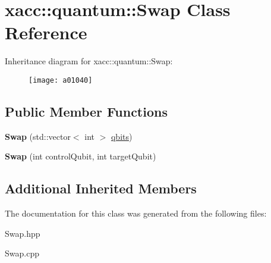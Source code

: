 \hypertarget{a01040}{}\section{xacc\+:\+:quantum\+:\+:Swap Class Reference}
\label{a01040}
Inheritance diagram for xacc\+:\+:quantum\+:\+:Swap\+:\begin{figure}[H]
\begin{center}
\leavevmode
\texttt{[image: a01040]}
\end{center}
\end{figure}
\subsection*{Public Member Functions}
\begin{DoxyCompactItemize}
\item 
\mbox{\label{a01040_a5c35a23a635f235a5615be65e769c121}} 
{\bfseries Swap} (std\+::vector$<$ int $>$ \hyperlink{a00992_a2a56be6c2519ea65df4d06f4abae1393}{qbits})
\item 
\mbox{\label{a01040_ac19efe303b798e14441a2c235b5ba7f3}} 
{\bfseries Swap} (int control\+Qubit, int target\+Qubit)
\end{DoxyCompactItemize}
\subsection*{Additional Inherited Members}


The documentation for this class was generated from the following files\+:\begin{DoxyCompactItemize}
\item 
Swap.\+hpp\item 
Swap.\+cpp\end{DoxyCompactItemize}
